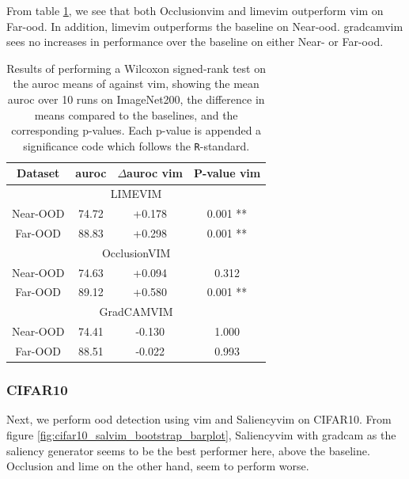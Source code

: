 \documentclass[UKenglish]{uiomasterthesis} %
\theoremstyle{definition}
\begin{document}
From table \ref{table:imagenet200_salvim_ttest}, we see that both Occlusion\ac{vim} and \ac{lime}\ac{vim} outperform \ac{vim} on Far-\ac{ood}. In addition, \ac{lime}\ac{vim} outperforms the baseline on Near-\ac{ood}. \ac{gradcam}\ac{vim} sees no increases in performance over the baseline on either Near- or Far-\ac{ood}.

\begin{table}[H]
\setlength\tabcolsep{3pt}
\begin{center}
\begin{tabular}{ |c|c|c|c| }
    \hline
    Dataset & \ac{auroc} & $\Delta$\ac{auroc} \ac{vim} & P-value \ac{vim} \\
    \hline
    \hline
    \multicolumn{4}{|c|}{LIMEVIM} \\
    \hline
    \rowcolor{near!50}
    Near-OOD & 74.72 & +0.178 & 0.001 ** \\
    \rowcolor{far!50}
    Far-OOD & 88.83 & +0.298 & 0.001 ** \\
    \hline
    \hline
    \multicolumn{4}{|c|}{OcclusionVIM} \\
    \hline
    \rowcolor{near!50}
    Near-OOD & 74.63 & +0.094 & 0.312 \\
    \rowcolor{far!50}
    Far-OOD & 89.12 & +0.580 & 0.001 ** \\
    \hline
    \hline
    \multicolumn{4}{|c|}{GradCAMVIM} \\
    \hline
    \rowcolor{near!50}
    Near-OOD & 74.41 & -0.130 & 1.000 \\
    \rowcolor{far!50}
    Far-OOD & 88.51 & -0.022 & 0.993 \\
    \hline
    \end{tabular}
    \caption[Wilcoxon signed-rank test for salvim on ImageNet200]{Results of performing a Wilcoxon signed-rank test on the \ac{auroc} means of against \ac{vim}, showing the mean \ac{auroc} over 10 runs on ImageNet200, the difference in means compared to the baselines, and the corresponding p-values. Each p-value is appended a significance code which follows the \texttt{R}-standard.}
    \label{table:imagenet200_salvim_ttest}
\end{center}
\setlength\tabcolsep{6pt}
\end{table}

\subsubsection{CIFAR10}

Next, we perform \ac{ood} detection using \ac{vim} and Saliency\ac{vim} on CIFAR10. From figure \ref{fig:cifar10_salvim_bootstrap_barplot}, Saliency\ac{vim} with \ac{gradcam} as the saliency generator seems to be the best performer here, above the baseline. Occlusion and \ac{lime} on the other hand, seem to perform worse.
\end{document}
